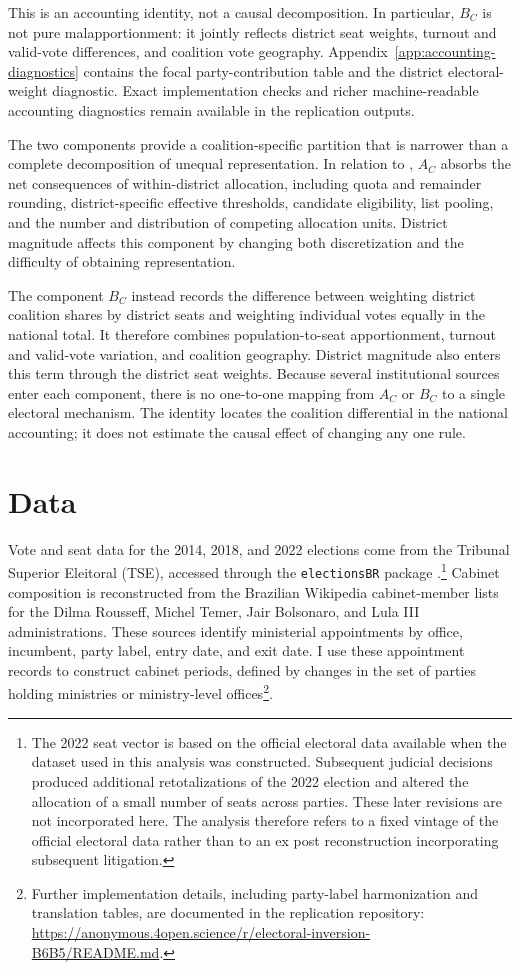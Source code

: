 \documentclass[11pt]{article}
\begin{document}
This is an accounting identity, not a causal decomposition. In particular,
\(B_C\) is not pure malapportionment: it jointly reflects district seat
weights, turnout and valid-vote differences, and coalition vote geography.
Appendix~\ref{app:accounting-diagnostics} contains the focal
party-contribution table and the district electoral-weight diagnostic. Exact
implementation checks and richer machine-readable accounting diagnostics
remain available in the replication outputs.

The two components provide a coalition-specific partition that is narrower
than a complete decomposition of unequal representation. In relation to
\textcite{bochsler2026winners}, \(A_C\) absorbs the net consequences of
within-district allocation, including quota and remainder rounding,
district-specific effective thresholds, candidate eligibility, list pooling,
and the number and distribution of competing allocation units. District
magnitude affects this component by changing both discretization and the
difficulty of obtaining representation.

The component \(B_C\) instead records the difference between weighting
district coalition shares by district seats and weighting individual votes
equally in the national total. It therefore combines population-to-seat
apportionment, turnout and valid-vote variation, and coalition geography.
District magnitude also enters this term through the district seat weights.
Because several institutional sources enter each component, there is no
one-to-one mapping from \(A_C\) or \(B_C\) to a single electoral mechanism.
The identity locates the coalition differential in the national accounting; it
does not estimate the causal effect of changing any one rule.
\section{Data}
\label{sec:data}

Vote and seat data for the 2014, 2018, and 2022 elections come from the Tribunal Superior
Eleitoral (TSE), accessed through the \texttt{electionsBR} package
\parencite{electionsbr}.\footnote{The 2022 seat vector is based on the official
electoral data available when the dataset used in this analysis was constructed.
Subsequent judicial decisions produced additional retotalizations of the 2022
election and altered the allocation of a small number of seats across parties.
These later revisions are not incorporated here. The analysis therefore refers
to a fixed vintage of the official electoral data rather than to an ex post
reconstruction incorporating subsequent litigation.} Cabinet composition is reconstructed from the
Brazilian Wikipedia cabinet-member lists for the Dilma Rousseff, Michel Temer,
Jair Bolsonaro, and Lula III administrations. These sources identify ministerial
appointments by office, incumbent, party label, entry date, and exit date. I use
these appointment records to construct cabinet periods, defined by changes in
the set of parties holding ministries or ministry-level offices\footnote{Further
  implementation details, including party-label harmonization and translation
  tables, are documented in the replication repository: \url{https://anonymous.4open.science/r/electoral-inversion-B6B5/README.md}.}.
\end{document}
